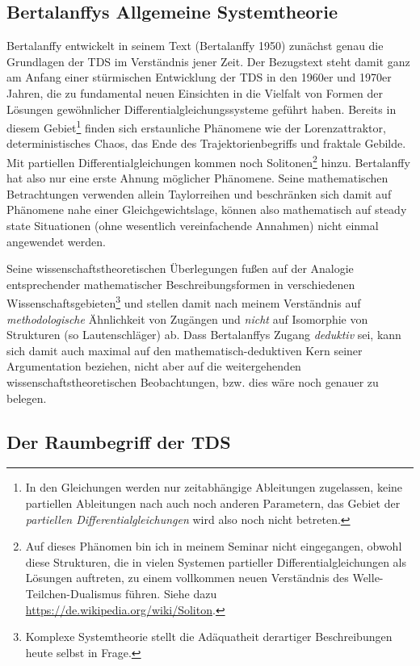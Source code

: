\documentclass[11pt,a4paper]{article}
\begin{document}
\subsection{Bertalanffys Allgemeine Systemtheorie}

Bertalanffy entwickelt in seinem Text (Bertalanffy 1950) zunächst genau die
Grundlagen der TDS im Verständnis jener Zeit.  Der Bezugstext steht damit ganz
am Anfang einer stürmischen Entwicklung der TDS in den 1960er und 1970er
Jahren, die zu fundamental neuen Einsichten in die Vielfalt von Formen der
Lösungen gewöhnlicher Differentialgleichungssysteme geführt haben.  Bereits in
diesem Gebiet\footnote{In den Gleichungen werden nur zeitabhängige Ableitungen
  zugelassen, keine partiellen Ableitungen nach auch noch anderen Parametern,
  das Gebiet der \emph{partiellen Differentialgleichungen} wird also noch
  nicht betreten.} finden sich erstaunliche Phänomene wie der Lorenzattraktor,
deterministisches Chaos, das Ende des Trajektorienbegriffs und fraktale
Gebilde. Mit partiellen Differentialgleichungen kommen noch
Solitonen\footnote{Auf dieses Phänomen bin ich in meinem Seminar nicht
  eingegangen, obwohl diese Strukturen, die in vielen Systemen partieller
  Differentialgleichungen als Lösungen auftreten, zu einem vollkommen neuen
  Verständnis des Welle-Teilchen-Dualismus führen. Siehe dazu
  \url{https://de.wikipedia.org/wiki/Soliton}. } hinzu. Bertalanffy hat also
nur eine erste Ahnung möglicher Phänomene. Seine mathematischen Betrachtungen
verwenden allein Taylorreihen und beschränken sich damit auf Phänomene nahe
einer Gleichgewichtslage, können also mathematisch auf steady state
Situationen (ohne wesentlich vereinfachende Annahmen) nicht einmal angewendet
werden.

Seine wissenschaftstheoretischen Überlegungen fußen auf der Analogie
entsprechender mathematischer Beschreibungsformen in verschiedenen
Wissenschaftsgebieten\footnote{Komplexe Systemtheorie stellt die Adäquatheit
  derartiger Beschreibungen heute selbst in Frage.} und stellen damit nach
meinem Verständnis auf \emph{methodologische} Ähnlichkeit von Zugängen und
\emph{nicht} auf Isomorphie von Strukturen (so Lautenschläger) ab. Dass
Bertalanffys Zugang \emph{deduktiv} sei, kann sich damit auch maximal auf den
mathematisch-deduktiven Kern seiner Argumentation beziehen, nicht aber auf die
weitergehenden wissenschaftstheoretischen Beobachtungen, bzw. dies wäre noch
genauer zu belegen.

\subsection{Der Raumbegriff der TDS}
\end{document}
